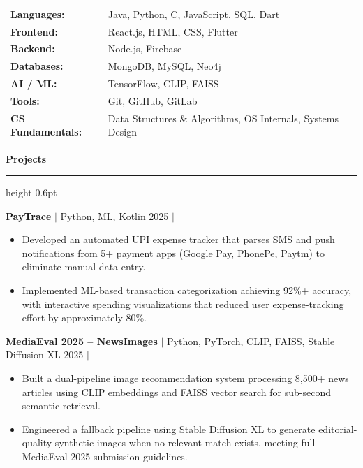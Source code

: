 \documentclass[10pt, a4paper]{article}
\newcommand{\sectionhead}[1]{%
    \vspace{4pt}%
    {\fontsize{11pt}{13pt}\selectfont\color{sectioncolor}\textbf{#1}}%
    \vspace{1.5pt}%
    {\color{rulecolor}\hrule height 0.6pt}%
    \vspace{3pt}%
}
\newcommand{\projecttitle}[3]{%
    \noindent\textbf{\color{sectioncolor}#1} {\color{subtext}$|$ #2} \hfill {\color{subtext}#3}%
}
\begin{document}
{\fontsize{10pt}{12pt}\selectfont
\begin{tabularx}{\textwidth}{ @{} l X @{} }
\textbf{\color{sectioncolor}Languages:} & Java, Python, C, JavaScript, SQL, Dart \\[1pt]
\textbf{\color{sectioncolor}Frontend:} & React.js, HTML, CSS, Flutter \\[1pt]
\textbf{\color{sectioncolor}Backend:} & Node.js, Firebase \\[1pt]
\textbf{\color{sectioncolor}Databases:} & MongoDB, MySQL, Neo4j \\[1pt]
\textbf{\color{sectioncolor}AI / ML:} & TensorFlow, CLIP, FAISS \\[1pt]
\textbf{\color{sectioncolor}Tools:} & Git, GitHub, GitLab \\[1pt]
\textbf{\color{sectioncolor}CS Fundamentals:} & Data Structures \& Algorithms, OS Internals, Systems Design \\
\end{tabularx}
}

\sectionhead{Projects}

\projecttitle{PayTrace}{Python, ML, Kotlin}{2025 $|$ \href{https://github.com/jeeva2470041}{\color{accent}\faGithub}}
\begin{itemize}
    \item Developed an automated UPI expense tracker that parses SMS and push notifications from 5+ payment apps (Google Pay, PhonePe, Paytm) to eliminate manual data entry.
    \item Implemented ML-based transaction categorization achieving 92\%+ accuracy, with interactive spending visualizations that reduced user expense-tracking effort by approximately 80\%.
\end{itemize}

\vspace{2pt}
\projecttitle{MediaEval 2025 -- NewsImages}{Python, PyTorch, CLIP, FAISS, Stable Diffusion XL}{2025 $|$ \href{https://github.com/jeeva2470041}{\color{accent}\faGithub}}
\begin{itemize}
    \item Built a dual-pipeline image recommendation system processing 8,500+ news articles using CLIP embeddings and FAISS vector search for sub-second semantic retrieval.
    \item Engineered a fallback pipeline using Stable Diffusion XL to generate editorial-quality synthetic images when no relevant match exists, meeting full MediaEval 2025 submission guidelines.
\end{itemize}
\end{document}
